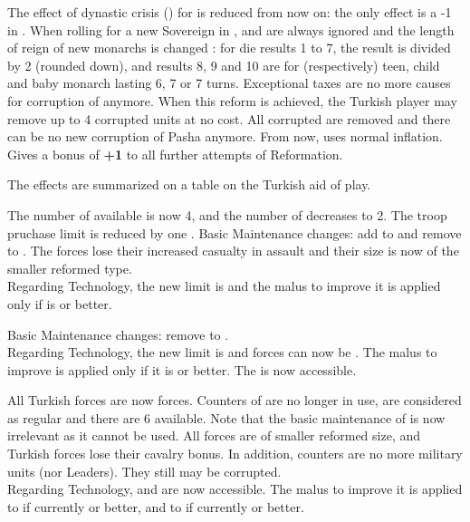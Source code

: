 The effect of dynastic crisis () for
\TUR is reduced from now on: the only effect is a -1 in \STAB.  When
rolling for a new Sovereign in , \DC and
 are always ignored and the length of reign of new
monarchs is changed : for die results 1 to 7, the result is divided by 2
(rounded down), and results 8, 9 and 10 are for (respectively) teen,
child and baby monarch lasting 6, 7 or 7 turns.
Exceptional taxes are no more causes for corruption of \Pasha
anymore. When this reform is achieved, the Turkish player may remove up
to 4 corrupted \Pasha units at no cost.
All corrupted \Pashas are removed and there can be no new corruption of
Pasha anymore. From now, \TUR uses normal inflation. Gives a bonus
of {\bf +1} to all further attempts of Reformation.

 The effects are summarized on a table on the
Turkish aid of play.

The number of \Janissaire \ARMY available is now 4, and the number of
\Timar \ARMY decreases to 2. The troop pruchase limit is reduced by one \LD.
Basic Maintenance changes: add \ARMY\facemoins to \Janissaire and
remove \ARMY\faceplus to \Timar.
The \Janissaire forces lose their increased casualty
in assault and their size is now of the smaller reformed type.
\\
Regarding Technology, the new limit is \TBAR and the malus to improve
it is applied only if  is \TMUS or better.

Basic Maintenance changes: remove \ARMY\faceplus to \Timar.
\\
Regarding Technology, the new limit is \TMUS and \Timar forces can now
be \TMUS.  The malus to improve  is applied
only if it is \TMUS or better. The  \TBAT is
now accessible.

All Turkish forces are now \Janissaire forces.  Counters of \Timar \ARMY
are no longer in use, \Timar \LD are considered as regular \Janissaire
and there are 6 \Janissaire\ARMY available.  Note that the basic
maintenance of \Timar is now irrelevant as it cannot be used.  All
forces are of smaller reformed size, and Turkish forces lose their
cavalry bonus.  In addition, \Pasha counters are no more military units
(nor Leaders). They still may be corrupted.
\\
Regarding Technology, \TMAN and \TTD are now accessible.  The malus to
improve it is applied to  if currently \TBAR or
better, and to  if currently \TBAT or better.

